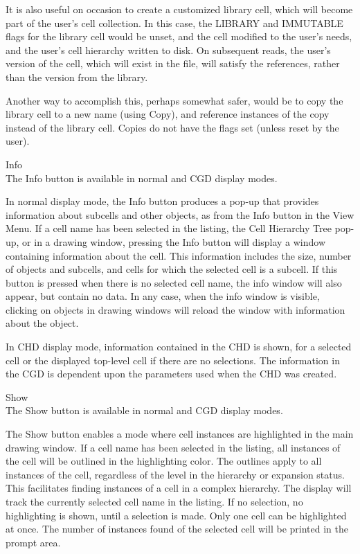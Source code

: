 \begin{description}
It is also useful on occasion to create a customized library cell,
which will become part of the user's cell collection.  In this case,
the LIBRARY and IMMUTABLE flags for the library cell would be unset,
and the cell modified to the user's needs, and the user's cell
hierarchy written to disk.  On subsequent reads, the user's version of
the cell, which will exist in the file, will satisfy the references,
rather than the version from the library.

Another way to accomplish this, perhaps somewhat safer, would be to
copy the library cell to a new name (using {\cb Copy}), and reference
instances of the copy instead of the library cell.  Copies do not have
the flags set (unless reset by the user).

\item{\cb Info}\\
The {\cb Info} button is available in normal and CGD display modes.

In normal display mode, the {\cb Info} button produces a pop-up that
provides information about subcells and other objects, as from the
{\cb Info} button in the {\cb View Menu}.  If a cell name has been
selected in the listing, the {\cb Cell Hierarchy Tree} pop-up, or in a
drawing window, pressing the {\cb Info} button will display a window
containing information about the cell.  This information includes the
size, number of objects and subcells, and cells for which the selected
cell is a subcell.  If this button is pressed when there is no
selected cell name, the info window will also appear, but contain no
data.  In any case, when the info window is visible, clicking on
objects in drawing windows will reload the window with information
about the object.

In CHD display mode, information contained in the CHD is shown, for a
selected cell or the displayed top-level cell if there are no
selections.  The information in the CGD is dependent upon the
parameters used when the CHD was created.

\item{\cb Show}\\
The {\cb Show} button is available in normal and CGD display modes.

The {\cb Show} button enables a mode where cell instances are
highlighted in the main drawing window.  If a cell name has been
selected in the listing, all instances of the cell will be outlined in
the highlighting color.  The outlines apply to all instances of the
cell, regardless of the level in the hierarchy or expansion status. 
This facilitates finding instances of a cell in a complex hierarchy. 
The display will track the currently selected cell name in the
listing.  If no selection, no highlighting is shown, until a selection
is made.  Only one cell can be highlighted at once.  The number of
instances found of the selected cell will be printed in the prompt
area.


\end{description}

